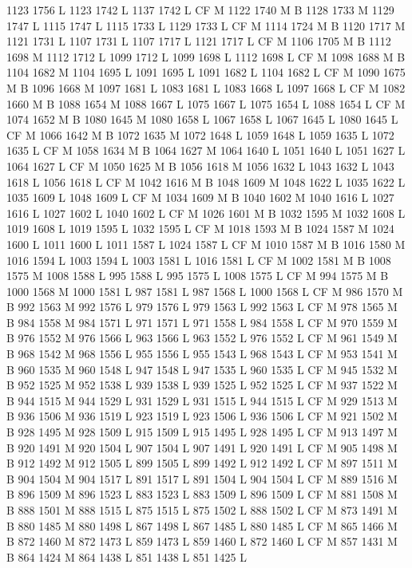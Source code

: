 {{{{{{{{{{{{{{{{{{{{{{{{1123 1756 L
1123 1742 L
1137 1742 L
CF M
1122 1740 M B
1128 1733 M 1129 1747 L
1115 1747 L
1115 1733 L
1129 1733 L
CF M
1114 1724 M B
1120 1717 M 1121 1731 L
1107 1731 L
1107 1717 L
1121 1717 L
CF M
1106 1705 M B
1112 1698 M 1112 1712 L
1099 1712 L
1099 1698 L
1112 1698 L
CF M
1098 1688 M B
1104 1682 M 1104 1695 L
1091 1695 L
1091 1682 L
1104 1682 L
CF M
1090 1675 M B
1096 1668 M 1097 1681 L
1083 1681 L
1083 1668 L
1097 1668 L
CF M
1082 1660 M B
1088 1654 M 1088 1667 L
1075 1667 L
1075 1654 L
1088 1654 L
CF M
1074 1652 M B
1080 1645 M 1080 1658 L
1067 1658 L
1067 1645 L
1080 1645 L
CF M
1066 1642 M B
1072 1635 M 1072 1648 L
1059 1648 L
1059 1635 L
1072 1635 L
CF M
1058 1634 M B
1064 1627 M 1064 1640 L
1051 1640 L
1051 1627 L
1064 1627 L
CF M
1050 1625 M B
1056 1618 M 1056 1632 L
1043 1632 L
1043 1618 L
1056 1618 L
CF M
1042 1616 M B
1048 1609 M 1048 1622 L
1035 1622 L
1035 1609 L
1048 1609 L
CF M
1034 1609 M B
1040 1602 M 1040 1616 L
1027 1616 L
1027 1602 L
1040 1602 L
CF M
1026 1601 M B
1032 1595 M 1032 1608 L
1019 1608 L
1019 1595 L
1032 1595 L
CF M
1018 1593 M B
1024 1587 M 1024 1600 L
1011 1600 L
1011 1587 L
1024 1587 L
CF M
1010 1587 M B
1016 1580 M 1016 1594 L
1003 1594 L
1003 1581 L
1016 1581 L
CF M
1002 1581 M B
1008 1575 M 1008 1588 L
995 1588 L
995 1575 L
1008 1575 L
CF M
994 1575 M B
1000 1568 M 1000 1581 L
987 1581 L
987 1568 L
1000 1568 L
CF M
986 1570 M B
992 1563 M 992 1576 L
979 1576 L
979 1563 L
992 1563 L
CF M
978 1565 M B
984 1558 M 984 1571 L
971 1571 L
971 1558 L
984 1558 L
CF M
970 1559 M B
976 1552 M 976 1566 L
963 1566 L
963 1552 L
976 1552 L
CF M
961 1549 M B
968 1542 M 968 1556 L
955 1556 L
955 1543 L
968 1543 L
CF M
953 1541 M B
960 1535 M 960 1548 L
947 1548 L
947 1535 L
960 1535 L
CF M
945 1532 M B
952 1525 M 952 1538 L
939 1538 L
939 1525 L
952 1525 L
CF M
937 1522 M B
944 1515 M 944 1529 L
931 1529 L
931 1515 L
944 1515 L
CF M
929 1513 M B
936 1506 M 936 1519 L
923 1519 L
923 1506 L
936 1506 L
CF M
921 1502 M B
928 1495 M 928 1509 L
915 1509 L
915 1495 L
928 1495 L
CF M
913 1497 M B
920 1491 M 920 1504 L
907 1504 L
907 1491 L
920 1491 L
CF M
905 1498 M B
912 1492 M 912 1505 L
899 1505 L
899 1492 L
912 1492 L
CF M
897 1511 M B
904 1504 M 904 1517 L
891 1517 L
891 1504 L
904 1504 L
CF M
889 1516 M B
896 1509 M 896 1523 L
883 1523 L
883 1509 L
896 1509 L
CF M
881 1508 M B
888 1501 M 888 1515 L
875 1515 L
875 1502 L
888 1502 L
CF M
873 1491 M B
880 1485 M 880 1498 L
867 1498 L
867 1485 L
880 1485 L
CF M
865 1466 M B
872 1460 M 872 1473 L
859 1473 L
859 1460 L
872 1460 L
CF M
857 1431 M B
864 1424 M 864 1438 L
851 1438 L
851 1425 L
}}}}}}}}}}}}}}}}}}}}}}}}
